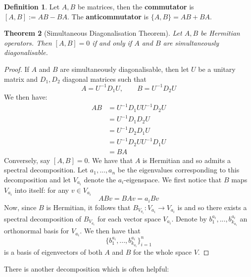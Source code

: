 \documentclass[12pt]{article}
\theoremstyle{plain}
\newtheorem{thm}{Theorem}[subsection] %
\theoremstyle{definition}
\newtheorem{defn}[thm]{Definition} %
\newcommand{\lto}{\longrightarrow}
\begin{document}
\begin{defn}
	Let $A,B$ be matrices, then the \textbf{commutator} is $[A,B] := AB - BA$. The \textbf{anticommutator} is $\lbrace A,B \rbrace = AB + BA$.
\end{defn}
\begin{thm}[Simultaneous Diagonalisation Theorem]
	Let $A,B$ be Hermitian operators. Then $[A,B] = 0$ if and only if $A$ and $B$ are simultaneously diagonalisable.
\end{thm}
\begin{proof}
	If $A$ and $B$ are simultaneously diagonalisable, then let $U$ be a unitary matrix and $D_1,D_2$ diagonal matrices such that
	\begin{equation}
		A = U^{-1}D_1U,\qquad B = U^{-1}D_2U
	\end{equation}
	We then have:
	\begin{align*}
		AB &= U^{-1}D_1UU^{-1}D_2U\\
		&= U^{-1}D_1D_2U\\
		&= U^{-1}D_2D_1U\\
		&= U^{-1}D_2UU^{-1}D_1U\\
		&= BA
	\end{align*}
	Conversely, say $[A,B] = 0$. We have that $A$ is Hermitian and so admits a spectral decomposition. Let $a_1,...,a_n$ be the eigenvalues corresponding to this decomposition and let $V_{a_i}$ denote the $a_i$-eigenspace. We first notice that $B$ maps $V_{a_i}$ into itself: for any $v \in V_{a_i}$
	\begin{equation}
		ABv = BAv = a_{i}Bv
	\end{equation}
	Now, since $B$ is Hermitian, it follows that $B_{V_{a_i}}: V_{a_i} \lto V_{a_i}$ is and so there exists a spectral decomposition of $B_{V_{a_i}}$ for each vector space $V_{a_i}$. Denote by $b_1^{a_i},...,b_{k_{a_i}}^{a_i}$ an orthonormal basis for $V_{a_i}$. We then have that
	\begin{equation}
		\lbrace b_1^{a_i},...,b_{k_{a_i}}^{a_i}\rbrace_{i = 1}^n
	\end{equation}
	is a basis of eigenvectors of both $A$ and $B$ for the whole space $V$.
\end{proof}
There is another decomposition which is often helpful:
\end{document}
